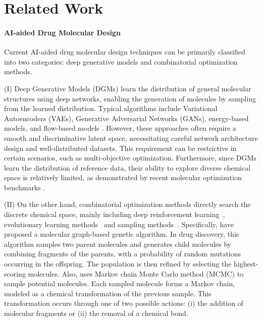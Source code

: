 \section{Related Work}
\paragraph{AI-aided Drug Molecular Design} 
Current AI-aided drug molecular design techniques can be primarily classified into two categories: deep generative models and combinatorial optimization methods. 

\noindent(I) Deep Generative Models (DGMs) learn the distribution of general molecular structures using deep networks, enabling the generation of molecules by sampling from the learned distribution. Typical algorithms include Variational Autoencoders (VAEs), Generative Adversarial Networks (GANs), energy-based models, and flow-based models \citep{gomez2018automatic, jin2018junction, de2018molgan, segler2018generating, fu2020core, honda2019graph, madhawa2019graphnvp, liu2021graphebm,fu2022antibody,chen2024uncertainty,bagal2021liggpt}. However, these approaches often require a smooth and discriminative latent space, necessitating careful network architecture design and well-distributed datasets. This requirement can be restrictive in certain scenarios, such as multi-objective optimization. Furthermore, since DGMs learn the distribution of reference data, their ability to explore diverse chemical space is relatively limited, as demonstrated by recent molecular optimization benchmarks \citep{brown2019guacamol, huang2021therapeutics,gao2022samples}. 

\noindent (II) On the other hand, combinatorial optimization methods directly search the discrete chemical space, mainly including deep reinforcement learning~\citep{You2018-xh,zhou2019optimization,jin2020multi,gottipati2020learning}, evolutionary learning methods~\citep{nigam2019augmenting,jensen2019graph,fu2022reinforced} and sampling methods~\citep{xie2021mars,fu2021mimosa}. Specifically, \citet{graph-ga} have proposed a molecular graph-based genetic algorithm. In drug discovery, this algorithm samples two parent molecules and generates child molecules by combining fragments of the parents, with a probability of random mutations occurring in the offspring. The population is then refined by selecting the highest-scoring molecules.
Also, \citet{xie2021mars} uses Markov chain Monte Carlo method (MCMC) to sample potential molecules. Each sampled molecule forms a Markov chain, modeled as a chemical transformation of the previous sample. This transformation occurs through one of two possible actions: (i) the addition of molecular fragments or (ii) the removal of a chemical bond.

